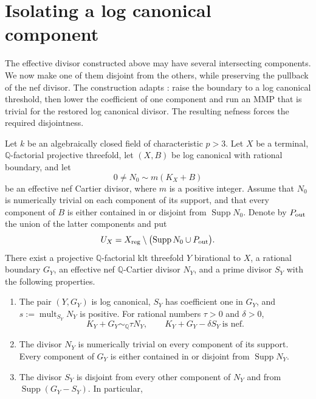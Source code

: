 \section{Isolating a log canonical component}\label{sec:isolation}

The effective divisor constructed above may have several intersecting
components.  We now make one of them disjoint from the others, while
preserving the pullback of the nef divisor.  The construction adapts
\cite[Section~2.3]{Companion}: raise the boundary to a log canonical
threshold, then lower the coefficient of one component and run an MMP
that is trivial for the restored log canonical divisor.  The resulting
nefness forces the required disjointness.

\begin{proposition}\label{prop:isolation}
Let $k$ be an algebraically closed field of characteristic $p>3$.
Let $X$ be a terminal, $\mathbb Q$-factorial projective threefold, let
$(X,B)$ be log canonical with rational boundary, and let
\[
  0\ne N_0\sim m(K_X+B)
\]
be an effective nef Cartier divisor, where $m$ is a positive integer.
Assume that $N_0$ is numerically trivial on each component of its
support, and that every component of $B$ is either contained in or
disjoint from $\operatorname{Supp}N_0$.  Denote by $P_{\rm out}$ the union
of the latter components and put
\[
  U_X=X_{\rm reg}\setminus
       \bigl(\operatorname{Supp}N_0\cup P_{\rm out}\bigr).
\]
There exist a projective $\mathbb Q$-factorial klt threefold $Y$
birational to $X$, a rational boundary $G_Y$, an effective nef
$\mathbb Q$-Cartier divisor $N_Y$, and a prime divisor $S_Y$ with the
following properties.
\begin{enumerate}
\item The pair $(Y,G_Y)$ is log canonical, $S_Y$ has coefficient one
in $G_Y$, and $s:=\operatorname{mult}_{S_Y}N_Y$ is positive.  For
rational numbers $\tau>0$ and $\delta>0$,
\begin{equation}\label{eq:isolation-nef}
  K_Y+G_Y\sim_{\mathbb Q}\tau N_Y,
  \qquad K_Y+G_Y-\delta S_Y\ \text{is nef}.
\end{equation}
\item The divisor $N_Y$ is numerically trivial on every component of
its support.  Every component of $G_Y$ is either contained in or
disjoint from $\operatorname{Supp}N_Y$.
\item The divisor $S_Y$ is disjoint from every other component of
$N_Y$ and from $\operatorname{Supp}(G_Y-S_Y)$.  In particular,
\begin{equation}\label{eq:isolation-local}

\end{equation}
\end{enumerate}
\end{proposition}
